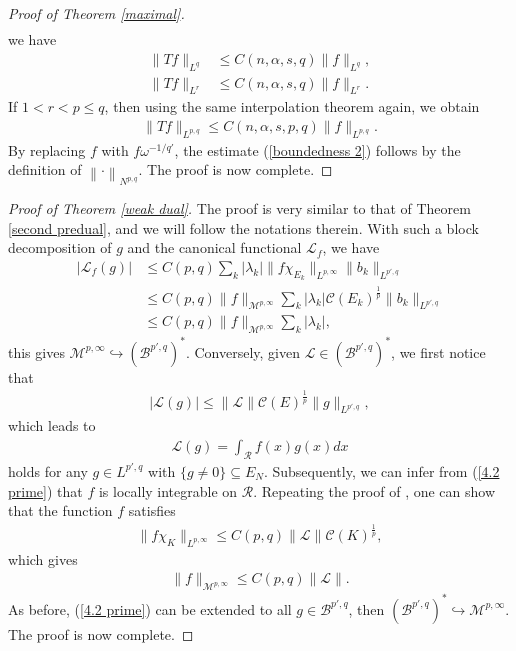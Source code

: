 \documentclass[10pt,reqno]{amsart}
\numberwithin{equation}{section}
\begin{document}
\begin{proof}[Proof of Theorem \ref{maximal}]
\begin{align*}
\end{align*}
we have
\begin{align*}
\|Tf\|_{L^{q}}&\leq C(n,\alpha,s,q)\|f\|_{L^{q}},\\
\|Tf\|_{L^{r}}&\leq C(n,\alpha,s,q)\|f\|_{L^{r}}.
\end{align*}
If $1<r<p\leq q$, then using the same interpolation theorem again, we obtain
\begin{align*}
\|Tf\|_{L^{p,q}}\leq C(n,\alpha,s,p,q)\|f\|_{L^{p,q}}.
\end{align*}
By replacing $f$ with $f\omega^{-1/q'}$, the estimate (\ref{boundedness 2}) follows by the definition of $\left\|\cdot\right\|_{N^{p,q}}$. The proof is now complete.
\end{proof}

\begin{proof}[Proof of Theorem \ref{weak dual}]
The proof is very similar to that of Theorem \ref{second predual}, and we will follow the notations therein. With such a block decomposition of $g$ and the canonical functional $\mathcal{L}_{f}$, we have
\begin{align*}
|\mathcal{L}_{f}(g)|&\leq C(p,q)\sum_{k}|\lambda_{k}|\|f\chi_{E_{k}}\|_{L^{p,\infty}}\|b_{k}\|_{L^{p',q}}\\
&\leq C(p,q)\|f\|_{\mathcal{M}^{p,\infty}}\sum_{k}|\lambda_{k}|\mathcal{C}(E_{k})^{\frac{1}{p}}\|b_{k}\|_{L^{p',q}}\\
&\leq C(p,q)\|f\|_{\mathcal{M}^{p,\infty}}\sum_{k}|\lambda_{k}|,
\end{align*}
this gives $\mathcal{M}^{p,\infty}\hookrightarrow(\mathcal{B}^{p',q})^{\ast}$. Conversely, given $\mathcal{L}\in(\mathcal{B}^{p',q})^{\ast}$, we first notice that  
\begin{align*}
|\mathcal{L}(g)|\leq\|\mathcal{L}\|\mathcal{C}(E)^{\frac{1}{p}}\|g\|_{L^{p',q}},
\end{align*}
which leads to 
\begin{align}\label{4.2 prime}
\mathcal{L}(g)=\int_{\mathcal{R}}f(x)g(x)dx
\end{align}
holds for any $g\in L^{p',q}$ with $\{g\ne 0\}\subseteq E_{N}$. Subsequently, we can infer from (\ref{4.2 prime}) that $f$ is locally integrable on $\mathcal{R}$. Repeating the proof of \cite[Theorem 1.4.16 (v)]{GL}, one can show that the function $f$ satisfies 
\begin{align*}
\|f\chi_{K}\|_{L^{p,\infty}}\leq C(p,q)\|\mathcal{L}\|\mathcal{C}(K)^{\frac{1}{p}},
\end{align*}
which gives 
\begin{align*}
\|f\|_{\mathcal{M}^{p,\infty}}\leq C(p,q)\|\mathcal{L}\|.
\end{align*}
As before, (\ref{4.2 prime}) can be extended to all $g\in\mathcal{B}^{p',q}$, then  $(\mathcal{B}^{p',q})^{\ast}\hookrightarrow\mathcal{M}^{p,\infty}$. The proof is now complete.
\end{proof}
\end{document}
